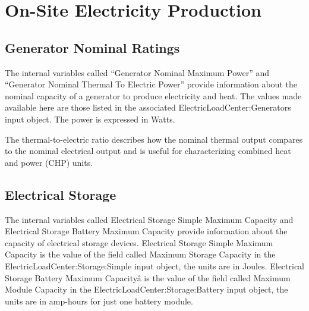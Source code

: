 \section{On-Site Electricity Production}\label{on-site-electricity-production-000}

\subsection{Generator Nominal Ratings}\label{generator-nominal-ratings}

The internal variables called ``Generator Nominal Maximum Power'' and ``Generator Nominal Thermal To Electric Power'' provide information about the nominal capacity of a generator to produce electricity and heat. The values made available here are those listed in the associated ElectricLoadCenter:Generators input object. The power is expressed in Watts.

The thermal-to-electric ratio describes how the nominal thermal output compares to the nominal electrical output and is useful for characterizing combined heat and power (CHP) units.

\subsection{Electrical Storage}\label{electrical-storage-000}

The internal variables called Electrical Storage Simple Maximum Capacity and Electrical Storage Battery Maximum Capacity provide information about the capacity of electrical storage devices. Electrical Storage Simple Maximum Capacity is the value of the field called Maximum Storage Capacity in the ElectricLoadCenter:Storage:Simple input object, the units are in Joules. Electrical Storage Battery Maximum Capacityâ is the value of the field called Maximum Module Capacity in the ElectricLoadCenter:Storage:Battery input object, the units are in amp-hours for just one battery module.
